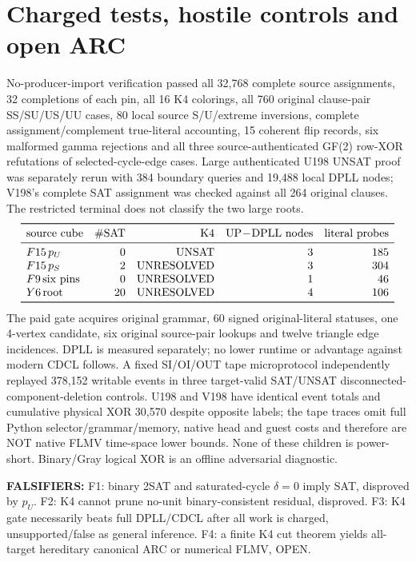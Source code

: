 \documentclass[11pt]{article}
\begin{document}
\section{Charged tests, hostile controls and open ARC}
No-producer-import verification passed all 32,768 complete source assignments, 32 completions of each pin, all 16 K4 colorings, all 760 original clause-pair SS/SU/US/UU cases, 80 local source S/U/extreme inversions, complete assignment/complement true-literal accounting, 15 coherent flip records, six malformed gamma rejections and all three source-authenticated GF(2) row-XOR refutations of selected-cycle-edge cases. Large authenticated U198 UNSAT proof was separately rerun with 384 boundary queries and 19,488 local DPLL nodes; V198's complete SAT assignment was checked against all 264 original clauses. The restricted terminal does not classify the two large roots.
\[
\begin{array}{lrrrr}
\toprule
{\rm source\ cube}&\# {\rm SAT}&{\rm K4}&{\rm UP\!-\!DPLL\ nodes}&{\rm literal\ probes}\\\midrule
F15\,p_U&0&{\rm UNSAT}&3&185\\
F15\,p_S&2&{\rm UNRESOLVED}&3&304\\
F9\,{\rm six\ pins}&0&{\rm UNRESOLVED}&1&46\\
Y6\,{\rm root}&20&{\rm UNRESOLVED}&4&106\\\bottomrule
\end{array}
\]
The paid gate acquires original grammar, $60$ signed original-literal statuses, one 4-vertex candidate, six original source-pair lookups and twelve triangle edge incidences. DPLL is measured separately; no lower runtime or advantage against modern CDCL follows. A fixed SI/OI/OUT tape microprotocol independently replayed 378,152 writable events in three target-valid SAT/UNSAT disconnected-component-deletion controls. U198 and V198 have identical event totals and cumulative physical XOR 30,570 despite opposite labels; the tape traces omit full Python selector/grammar/memory, native head and guest costs and therefore are NOT native FLMV time-space lower bounds. None of these children is power-short. Binary/Gray logical XOR is an offline adversarial diagnostic.

\noindent\textbf{FALSIFIERS:} F1: binary 2SAT and saturated-cycle $\delta=0$ imply SAT, disproved by $p_U$. F2: K4 cannot prune no-unit binary-consistent residual, disproved. F3: K4 gate necessarily beats full DPLL/CDCL after all work is charged, unsupported/false as general inference. F4: a finite K4 cut theorem yields all-target hereditary canonical ARC or numerical FLMV, OPEN.
\end{document}
